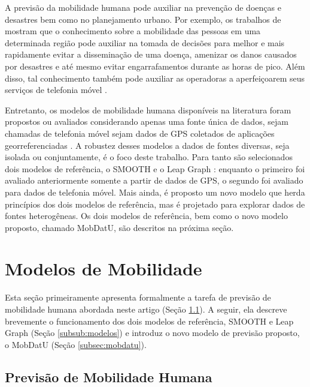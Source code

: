 \documentclass[10pt, a4paper, onecolumn, conference, compsocconf]{IEEEtran}
\begin{document}
A previsão da mobilidade humana pode auxiliar na prevenção de doenças e desastres bem como no planejamento urbano. Por exemplo, os trabalhos de \cite{barabasi200806,Balcan2009} mostram que o conhecimento sobre a mobilidade das pessoas em uma determinada região pode auxiliar na tomada de  decisões  para melhor e mais rapidamente evitar a disseminação de uma doença, amenizar os danos causados por desastres e até mesmo evitar engarrafamentos durante as horas de pico. Além disso, tal conhecimento também pode auxiliar as operadoras a aperfeiçoarem seus serviços de telefonia móvel \cite{Xavier2012}.

Entretanto, os modelos de mobilidade humana disponíveis na literatura foram propostos ou avaliados considerando apenas uma fonte única de dados, sejam chamadas de telefonia móvel \cite{Dong2013,barabasi2008,Balcan2009}  sejam dados de GPS coletados de aplicações georreferenciadas \cite{Kyunghan2009, Rhee2008, Munjal2011, Musolesi2007, noulas2011, Nguyen2012, cho2011}. A robustez desses modelos a dados de fontes diversas, seja isolada ou conjuntamente, é o foco deste trabalho. Para tanto são selecionados dois modelos de referência, o SMOOTH \cite{Munjal2011} e o Leap Graph \cite{Dong2013}: enquanto o primeiro foi avaliado anteriormente somente a partir de dados de GPS, o segundo foi avaliado para dados de telefonia móvel.  Mais ainda, é proposto um novo modelo que herda princípios dos dois modelos de referência, mas é projetado para explorar dados de fontes heterogêneas. Os dois modelos de referência, bem como o novo modelo proposto, chamado MobDatU, são descritos na próxima seção. 


 


\section{Modelos de Mobilidade}\label{sec:modelos}

Esta seção primeiramente apresenta formalmente a tarefa de previsão de mobilidade humana abordada neste artigo (Seção \ref{subsec:modelagem}). A seguir, ela descreve brevemente o funcionamento dos dois modelos de referência, SMOOTH e Leap Graph (Seção \ref{subsub:modelos}) e introduz o novo modelo de previsão proposto, o MobDatU (Seção \ref{subsec:mobdatu}).


\subsection{Previsão de Mobilidade Humana}\label{subsec:modelagem}
\end{document}
